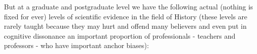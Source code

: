 	But at a graduate and postgraduate level we have the following actual (nothing is fixed for ever) levels of scientific evidence in the field of History (these levels are rarely taught because they may hurt and offend many believers and even put in cognitive dissonance an important proportion of professionals - teachers and professors - who have important anchor biases):
	\begin{figure}[H]
		\centering
		  
		
		\resizebox{\textwidth}{!}{
		\begin{tikzpicture}[x=0.75pt,y=0.75pt,yscale=-1,xscale=1]
		

\end{tikzpicture}}
\end{figure}

